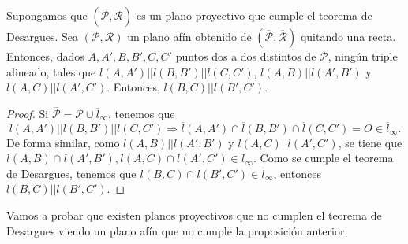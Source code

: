 \begin{prop}
Supongamos que $\displaystyle \left(\overline{\mathcal{P}}, \overline{\mathcal{R}}\right) $ es un plano proyectivo que cumple el teorema de Desargues. Sea $\displaystyle \left(\mathcal{P}, \mathcal{R}\right) $ un plano afín obtenido de $\displaystyle \left(\overline{\mathcal{P}}, \overline{\mathcal{R}}\right) $ quitando una recta. Entonces, dados $\displaystyle A,A',B,B',C,C'  $ puntos dos a dos distintos de $\displaystyle \mathcal{P} $, ningún triple alineado, tales que $\displaystyle l\left(A,A'\right) | | l\left(B, B'\right) | | l\left(C,C'\right) $, $\displaystyle l\left(A,B\right) | | l\left(A',B'\right) $ y $\displaystyle l\left(A,C\right) | | l\left(A',C'\right) $. Entonces, $\displaystyle l\left(B,C\right) | | l\left(B',C'\right) $.
\end{prop}
\begin{proof}
Si $\displaystyle \overline{\mathcal{P}} = \mathcal{P} \cup \overline{l}_{\infty} $, tenemos que 
\[l\left(A,A'\right) | | l\left(B,B'\right) | | l\left(C,C'\right) \Rightarrow \overline{l}\left(A,A'\right) \cap \overline{l}\left(B,B'\right) \cap \overline{l}\left(C,C'\right) = O \in \overline{l}_{\infty} .\]
De forma similar, como $\displaystyle l\left(A,B\right) | | l\left(A', B'\right) $ y $\displaystyle l\left(A,C\right) | | l\left(A',C'\right) $, se tiene que $\displaystyle \overline{l}\left(A,B\right) \cap \overline{l}\left(A',B'\right), \overline{l}\left(A,C\right)\cap \overline{l}\left(A',C'\right) \in \overline{l}_{\infty} $. Como se cumple el teorema de Desargues, tenemos que $\displaystyle \overline{l}\left(B,C\right) \cap \overline{l}\left(B',C'\right) \in \overline{l}_{\infty} $, entonces $\displaystyle l\left(B,C\right) | | l\left(B',C'\right) $.
\end{proof}
Vamos a probar que existen planos proyectivos que no cumplen el teorema de Desargues viendo un plano afín que no cumple la proposición anterior. 
